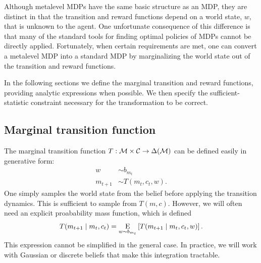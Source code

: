 Although metalevel MDPs have the same basic structure as an MDP, they are distinct in that the transition and reward functions depend on a world state, $w$, that is unknown to the agent. One unfortunate consequence of this difference is that many of the standard tools for finding optimal policies of MDPs cannot be directly applied. Fortunately, when certain requirements are met, one can convert a metalevel MDP into a standard MDP by marginalizing the world state out of the transition and reward functions.

In the following sections we define the marginal transition and reward functions, providing analytic expressions when possible. We then specify the sufficient-statistic constraint necessary for the transformation to be correct.

\subsection{Marginal transition function}
The marginal transition function $T: \M \times \C \rightarrow \Delta(\M)$ can be defined easily in generative form:
%
\begin{equation}
\begin{aligned}
  w &\sim b_{m_t}\\
  m_{t+1} &\sim T(m_t, c_t, w).
\end{aligned}
\end{equation}
%
One simply samples the world state from the belief before applying the transition dynamics. This is sufficient to sample from $T(m, c)$. However, we will often need an explicit proabability mass function, which is defined
%
\begin{equation}
T(m_{t+1} \mid m_t, c_t) = \expectunder{T(m_{t+1} \mid m_t, c_t, w)}{w \sim b_{m_t}}.
\end{equation}
This expression cannot be simplified in the general case. In practice, we will work with Gaussian or discrete beliefs that make this integration tractable.


